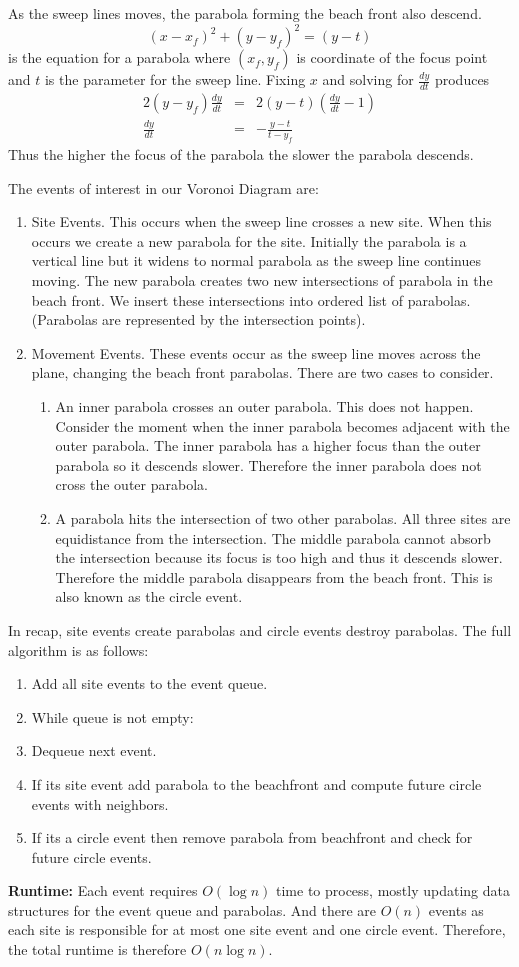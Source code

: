 \documentclass{article}
\begin{document}
As the sweep lines moves, the parabola forming the beach front also descend. $$ (x-x_f)^2 + (y-y_f)^2 = (y-t) $$ is the equation for a parabola where $(x_f, y_f)$ is coordinate of the focus point and $t$ is the parameter for the sweep line. Fixing $x$ and solving for $\frac{dy}{dt}$ produces
\begin{eqnarray}
2(y - y_f) \frac{dy}{dt} &=& 2(y-t)(\frac{dy}{dt} - 1)\\
\frac{dy}{dt}&=& -\frac{y-t}{t-y_f}
\end{eqnarray}
Thus the higher the focus of the parabola the slower the parabola descends. 

The events of interest in our Voronoi Diagram are:
\begin{enumerate}
\item Site Events. This occurs when the sweep line crosses a new site. When this occurs we create a new parabola for the site. Initially the parabola is a vertical line but it widens to normal parabola as the sweep line continues moving. The new parabola creates two new intersections of parabola in the beach front. We insert these intersections into ordered list of parabolas. (Parabolas are represented by the intersection points).
\item Movement Events. These events occur as the sweep line moves across the plane, changing the beach front parabolas. There are two cases to consider. 
\begin{enumerate}
\item An inner parabola crosses an outer parabola. This does not happen. Consider the moment when the inner parabola becomes adjacent with the outer parabola. The inner parabola has a higher focus than the outer parabola so it descends slower. Therefore the inner parabola does not cross the outer parabola.
\item A parabola hits the intersection of two other parabolas. All three sites are equidistance from the intersection. The middle parabola cannot absorb the intersection because its focus is too high and thus it descends slower. Therefore the middle parabola disappears from the beach front. This is also known as the circle event.
\end{enumerate}
\end{enumerate}

In recap, site events create parabolas and circle events destroy parabolas. The full algorithm is as follows:
\begin{enumerate}
\item Add all site events to the event queue.
\item While queue is not empty:
\item Dequeue next event. 
\item If its site event add parabola to the beachfront and compute future circle events with neighbors.  
\item If its a circle event then remove parabola from beachfront and check for future circle events. 
\end{enumerate}

\textbf{Runtime:}
Each event requires $O(\log n)$ time to process, mostly updating data structures for the event queue and parabolas. And there are $O(n)$ events as each site is responsible for at most one site event and one circle event. Therefore, the total runtime is therefore $O(n \log n)$.
\end{document}
